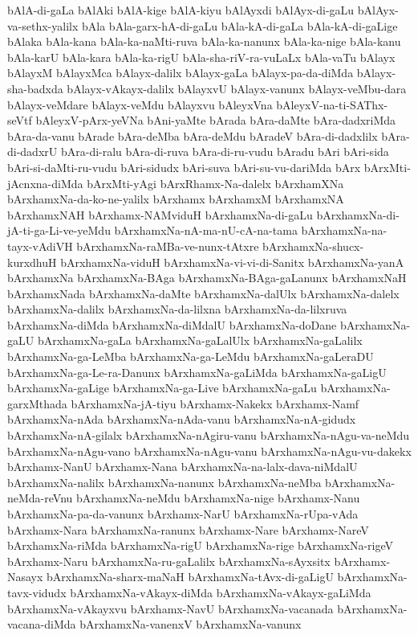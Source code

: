 {bAlA-di-gaLa
bAlAki
bAlA-kige
bAlA-kiyu
bAlAyxdi
bAlAyx-di-gaLu
bAlAyx-va-sethx-yalilx
bAla
bAla-garx-hA-di-gaLu
bAla-kA-di-gaLa
bAla-kA-di-gaLige
bAlaka
bAla-kana
bAla-ka-naMti-ruva
bAla-ka-nanunx
bAla-ka-nige
bAla-kanu
bAla-karU
bAla-kara
bAla-ka-rigU
bAla-sha-riV-ra-vuLaLx
bAla-vaTu
bAlayx
bAlayxM
bAlayxMca
bAlayx-dalilx
bAlayx-gaLa
bAlayx-pa-da-diMda
bAlayx-sha-badxda
bAlayx-vAkayx-dalilx
bAlayxvU
bAlayx-vanunx
bAlayx-veMbu-dara
bAlayx-veMdare
bAlayx-veMdu
bAlayxvu
bAleyxVna
bAleyxV-na-ti-SAThx-seVtf
bAleyxV-pArx-yeVNa
bAni-yaMte
bArada
bAra-daMte
bAra-dadxriMda
bAra-da-vanu
bArade
bAra-deMba
bAra-deMdu
bAradeV
bAra-di-dadxlilx
bAra-di-dadxrU
bAra-di-ralu
bAra-di-ruva
bAra-di-ru-vudu
bAradu
bAri
bAri-sida
bAri-si-daMti-ru-vudu
bAri-sidudx
bAri-suva
bAri-su-vu-dariMda
bArx
bArxMti-jAcnxna-diMda
bArxMti-yAgi
bArxRhamx-Na-dalelx
bArxhamXNa
bArxhamxNa-da-ko-ne-yalilx
bArxhamx
bArxhamxM
bArxhamxNA
bArxhamxNAH
bArxhamx-NAMviduH
bArxhamxNa-di-gaLu
bArxhamxNa-di-jA-ti-ga-Li-ve-yeMdu
bArxhamxNa-nA-ma-nU-cA-na-tama
bArxhamxNa-na-tayx-vAdiVH
bArxhamxNa-raMBa-ve-nunx-tAtxre
bArxhamxNa-shucx-kurxdhuH
bArxhamxNa-viduH
bArxhamxNa-vi-vi-di-Sanitx
bArxhamxNa-yanA
bArxhamxNa
bArxhamxNa-BAga
bArxhamxNa-BAga-gaLanunx
bArxhamxNaH
bArxhamxNada
bArxhamxNa-daMte
bArxhamxNa-dalUlx
bArxhamxNa-dalelx
bArxhamxNa-dalilx
bArxhamxNa-da-lilxna
bArxhamxNa-da-lilxruva
bArxhamxNa-diMda
bArxhamxNa-diMdalU
bArxhamxNa-doDane
bArxhamxNa-gaLU
bArxhamxNa-gaLa
bArxhamxNa-gaLalUlx
bArxhamxNa-gaLalilx
bArxhamxNa-ga-LeMba
bArxhamxNa-ga-LeMdu
bArxhamxNa-gaLeraDU
bArxhamxNa-ga-Le-ra-Danunx
bArxhamxNa-gaLiMda
bArxhamxNa-gaLigU
bArxhamxNa-gaLige
bArxhamxNa-ga-Live
bArxhamxNa-gaLu
bArxhamxNa-garxMthada
bArxhamxNa-jA-tiyu
bArxhamx-Nakekx
bArxhamx-Namf
bArxhamxNa-nAda
bArxhamxNa-nAda-vanu
bArxhamxNa-nA-gidudx
bArxhamxNa-nA-gilalx
bArxhamxNa-nAgiru-vanu
bArxhamxNa-nAgu-va-neMdu
bArxhamxNa-nAgu-vano
bArxhamxNa-nAgu-vanu
bArxhamxNa-nAgu-vu-dakekx
bArxhamx-NanU
bArxhamx-Nana
bArxhamxNa-na-lalx-dava-niMdalU
bArxhamxNa-nalilx
bArxhamxNa-nanunx
bArxhamxNa-neMba
bArxhamxNa-neMda-reVnu
bArxhamxNa-neMdu
bArxhamxNa-nige
bArxhamx-Nanu
bArxhamxNa-pa-da-vanunx
bArxhamx-NarU
bArxhamxNa-rUpa-vAda
bArxhamx-Nara
bArxhamxNa-ranunx
bArxhamx-Nare
bArxhamx-NareV
bArxhamxNa-riMda
bArxhamxNa-rigU
bArxhamxNa-rige
bArxhamxNa-rigeV
bArxhamx-Naru
bArxhamxNa-ru-gaLalilx
bArxhamxNa-sAyxsitx
bArxhamx-Nasayx
bArxhamxNa-sharx-maNaH
bArxhamxNa-tAvx-di-gaLigU
bArxhamxNa-tavx-vidudx
bArxhamxNa-vAkayx-diMda
bArxhamxNa-vAkayx-gaLiMda
bArxhamxNa-vAkayxvu
bArxhamx-NavU
bArxhamxNa-vacanada
bArxhamxNa-vacana-diMda
bArxhamxNa-vanenxV
bArxhamxNa-vanunx
}
